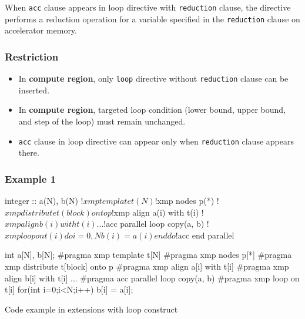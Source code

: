 When {\tt acc} clause appears in {\XMP} loop directive with {\tt reduction} clause,
the directive performs a reduction operation for a variable specified in the {\tt reduction} clause on accelerator memory.

\subsubsection*{Restriction}
\begin{itemize}
\item In {\OACC} {\bf compute region},
only {\XMP} {\tt loop} directive without {\tt reduction} clause can be inserted.
\item In {\OACC} {\bf compute region},
targeted loop condition (lower bound, upper bound, and step of the loop) must remain unchanged.
\item {\tt acc} clause in {\XMP} loop directive can appear only when {\tt reduction} clause appears there.
\end{itemize}

\subsubsection*{Example 1}
\begin{myfigure}
\begin{minipage}{0.45\hsize}
\begin{center}
\begin{XACCFexampleL}
integer :: a(N), b(N)
!$xmp template t(N)
!$xmp nodes p(*)
!$xmp distribute t(block) onto p
!$xmp align a(i) with t(i)
!$xmp align b(i) with t(i)
...
!$acc parallel loop copy(a, b)
!$xmp loop on t(i)
do i=0, N
  b(i) = a(i)
end do
!$acc end parallel
\end{XACCFexampleL}
\end{center}
\end{minipage}
%
\begin{minipage}{0.53\hsize}
\begin{center}
\begin{XACCCexampleR}
int a[N], b[N];
#pragma xmp template t[N]
#pragma xmp nodes p[*]
#pragma xmp distribute t[block] onto p
#pragma xmp align a[i] with t[i]
#pragma xmp align b[i] with t[i]
...
#pragma acc parallel loop copy(a, b)
#pragma xmp loop on t[i]
for(int i=0;i<N;i++){
  b[i] = a[i];
}

\end{XACCCexampleR}
\end{center}
\end{minipage}
\caption{Code example in {\XMP} extensions with {\OACC} loop construct}\label{code:ex-oacc-loop}
\end{myfigure}

